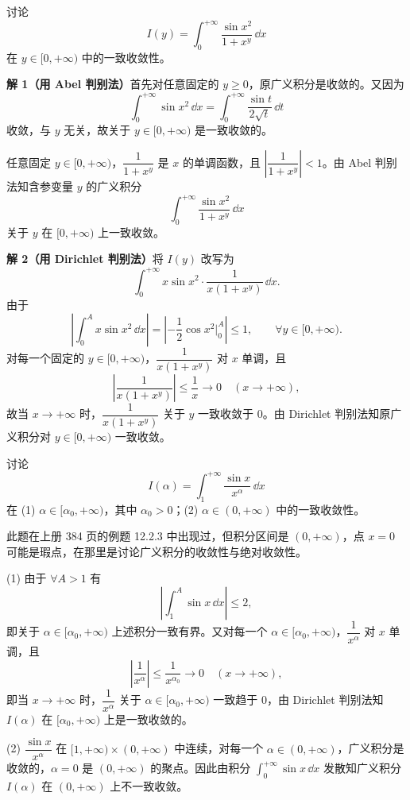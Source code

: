\begin{xexample}[23.2.1]
讨论
\[
  I(y)=\int_0^{+\infty}\frac{\sin x^2}{1+x^y}\,\dd x
\]
在 $y\in[0,+\infty)$ 中的一致收敛性。
\end{xexample}
\begin{xsolution}
\textbf{解 1（用 Abel 判别法）}\quad 首先对任意固定的 $y\geqslant0$，原广义积分是收敛的。又因为
\[
  \int_0^{+\infty}\sin x^2\,\dd x=\int_0^{+\infty}\frac{\sin t}{2\sqrt t}\,\dd t
\]
收敛，与 $y$ 无关，故关于 $y\in[0,+\infty)$ 是一致收敛的。

任意固定 $y\in[0,+\infty)$，$\dfrac1{1+x^y}$ 是 $x$ 的单调函数，且 $\left|\dfrac1{1+x^y}\right|<1$。由 Abel 判别法知含参变量 $y$ 的广义积分
\[
  \int_0^{+\infty}\frac{\sin x^2}{1+x^y}\,\dd x
\]
关于 $y$ 在 $[0,+\infty)$ 上一致收敛。

\textbf{解 2（用 Dirichlet 判别法）}\quad 将 $I(y)$ 改写为
\[
  \int_0^{+\infty}x\sin x^2\cdot\frac1{x(1+x^y)}\,\dd x.
\]
由于
\[
  \left|\int_0^A x\sin x^2\,\dd x\right|=\left|-\frac12\cos x^2\Big|_0^A\right|\leqslant1,
  \qquad \forall y\in[0,+\infty).
\]
对每一个固定的 $y\in[0,+\infty)$，$\dfrac1{x(1+x^y)}$ 对 $x$ 单调，且
\[
  \left|\frac1{x(1+x^y)}\right|\leqslant\frac1x\to0\quad(x\to+\infty),
\]
故当 $x\to+\infty$ 时，$\dfrac1{x(1+x^y)}$ 关于 $y$ 一致收敛于 0。由 Dirichlet 判别法知原广义积分对 $y\in[0,+\infty)$ 一致收敛。
\end{xsolution}

\begin{xexample}[23.2.2]
讨论
\[
  I(\alpha)=\int_1^{+\infty}\frac{\sin x}{x^\alpha}\,\dd x
\]
在 (1) $\alpha\in[\alpha_0,+\infty)$，其中 $\alpha_0>0$；(2) $\alpha\in(0,+\infty)$ 中的一致收敛性。
\end{xexample}
\begin{xremark}
此题在上册 384 页的例题 12.2.3 中出现过，但积分区间是 $(0,+\infty)$，点 $x=0$ 可能是瑕点，在那里是讨论广义积分的收敛性与绝对收敛性。
\end{xremark}
\begin{xsolution}
(1) 由于 $\forall A>1$ 有
\[
  \left|\int_1^A\sin x\,\dd x\right|\leqslant2,
\]
即关于 $\alpha\in[\alpha_0,+\infty)$ 上述积分一致有界。又对每一个 $\alpha\in[\alpha_0,+\infty)$，$\dfrac1{x^\alpha}$ 对 $x$ 单调，且
\[
  \left|\frac1{x^\alpha}\right|\leqslant\frac1{x^{\alpha_0}}\to0\quad(x\to+\infty),
\]
即当 $x\to+\infty$ 时，$\dfrac1{x^\alpha}$ 关于 $\alpha\in[\alpha_0,+\infty)$ 一致趋于 0，由 Dirichlet 判别法知 $I(\alpha)$ 在 $[\alpha_0,+\infty)$ 上是一致收敛的。

(2) $\dfrac{\sin x}{x^\alpha}$ 在 $[1,+\infty)\times(0,+\infty)$ 中连续，对每一个 $\alpha\in(0,+\infty)$，广义积分是收敛的，$\alpha=0$ 是 $(0,+\infty)$ 的聚点。因此由积分 $\displaystyle\int_0^{+\infty}\sin x\,\dd x$ 发散知广义积分 $I(\alpha)$ 在 $(0,+\infty)$ 上不一致收敛。
\end{xsolution}

